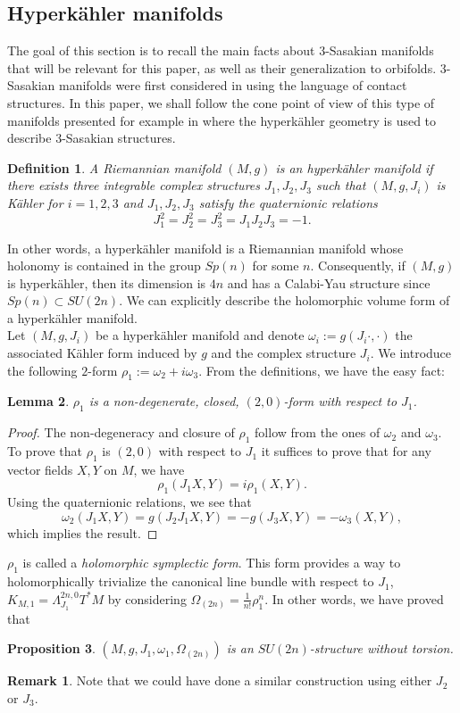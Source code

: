 \documentclass[12pt, reqno]{amsart}
\newtheorem{Def}{Definition}[subsection]
\newtheorem{prop}[Def]{Proposition}
\newtheorem{lemma}[Def]{Lemma}
\theoremstyle{definition}
\newtheorem{rk}{Remark}[subsection]
\begin{document}
\subsection{Hyperkähler manifolds}\label{3.1} The goal of this section is to recall the main facts about $3$-Sasakian manifolds that will be relevant for this paper, as well as  their generalization to orbifolds. $3$-Sasakian manifolds were first considered in \cite{Kuo1970OnAC} using the language of contact structures. In this paper, we shall follow the cone point of view of this type of manifolds presented for example in \cite{Boyer:1998sf} where the hyperkähler geometry is used to describe $3$-Sasakian structures. 
\begin{Def}
    A Riemannian manifold $(M,g)$ is an hyperkähler manifold if there exists three integrable complex structures $J_1,J_2,J_3$ such that $(M,g,J_i)$ is Kähler for $i=1,2,3$ and $J_1,J_2,J_3$ satisfy the quaternionic relations 
    $$J_1^2=J_2^2=J_3^2=J_1J_2J_3=-1.$$
\end{Def}
In other words, a hyperkähler manifold is a Riemannian manifold whose holonomy is contained in the group $Sp(n)$ for some $n$. Consequently, if $(M,g)$ is hyperkähler, then its dimension is $4n$ and has a Calabi-Yau structure since $Sp(n)\subset SU(2n)$. We can explicitly describe the holomorphic volume form of a hyperkähler manifold. \\ 
\indent Let $(M,g,J_i)$ be a hyperkähler manifold and denote $\omega_i:=g(J_i\cdot,\cdot)$ the associated Kähler form induced by $g$ and the complex structure $J_i$. We introduce the following $2$-form $\rho_1:=\omega_2+i\omega_3$. From the definitions, we have the easy fact:
\begin{lemma}
    $\rho_1$ is a non-degenerate, closed, $(2,0)$-form with respect to $J_1$.
\end{lemma}
\begin{proof}
    The non-degeneracy and closure of $\rho_1$ follow from the ones of $\omega_2$ and $\omega_3$. To prove that $\rho_1$ is $(2,0)$ with respect to $J_1$ it suffices to prove that for any vector fields $X,Y$ on $M$, we have
    $$\rho_1(J_1X,Y)=i\rho_1(X,Y).$$ Using the quaternionic relations, we see that $$\omega_2(J_1X,Y)=g(J_2J_1X,Y)=-g(J_3X,Y)=-\omega_3(X,Y),$$ which implies the result. 
\end{proof}
$\rho_1$ is called a \textit{holomorphic symplectic form}. This form provides a way to holomorphically trivialize the canonical line bundle with respect to $J_1$, $K_{M,1}=\Lambda^{2n,0}_{J_1}T^*M$ by considering $\Omega_{(2n)}=\frac{1}{n!}\rho_1^n$. In other words, we have proved that
\begin{prop}
    $(M,g,J_1,\omega_1,\Omega_{(2n)})$ is an $SU(2n)$-structure without torsion.
\end{prop}
\begin{rk}
    Note that we could have done a similar construction using either $J_2$ or $J_3$.
\end{rk}
\end{document}
